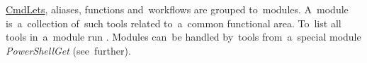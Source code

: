 \label{powershellmodule}
\hyperref[powershellcmdlet]{CmdLets}, aliases, functions and~workflows are grouped to~modules.
A~module is~a~collection of~such tools related to~a~common functional area.
To~list all tools in~a~module run .
Modules can~be handled by~tools from~a~special module \textit{PowerShellGet} (see~further).
